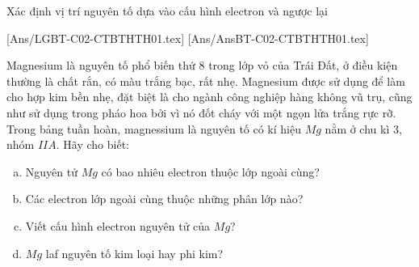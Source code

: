 \documentclass[Main_HOA10.tex]{subfiles}
\begin{document}
\hienthiloigiaibt
\begin{dang}{Xác định vị trí nguyên tố dựa vào cấu hình electron và ngược lại}
\end{dang}
[Ans/LGBT-C02-CTBTHTH01.tex]
[Ans/AnsBT-C02-CTBTHTH01.tex]
\begin{bt} Magnesium là nguyên tố phổ biến thứ 8 trong lớp vỏ của Trái Đất, ở điều kiện thường là chất rắn, có màu trắng bạc, rất nhẹ. Magnesium được sử dụng để làm cho hợp kim bền nhẹ, đặt biệt là cho ngành công nghiệp hàng không vũ trụ, cũng như sử dụng trong pháo hoa bởi vì nó đốt cháy với một ngọn lửa trắng rực rỡ.
Trong bảng tuần hoàn, magnessium là nguyên tố có kí hiệu $Mg$ nằm ở chu kì $3$, nhóm $IIA$. Hãy cho biết:
	\begin{enumerate}[a)]
		\item Nguyên tử $Mg$ có bao nhiêu  electron thuộc lớp ngoài cùng?
		\item Các electron lớp ngoài cùng thuộc những phân lớp nào?
		\item  Viết cấu hình electron nguyên tử của $Mg$?
		\item $Mg$ laf nguyên tố  kim loại hay phi kim?
	\end{enumerate}
\end{bt}
\end{document}
